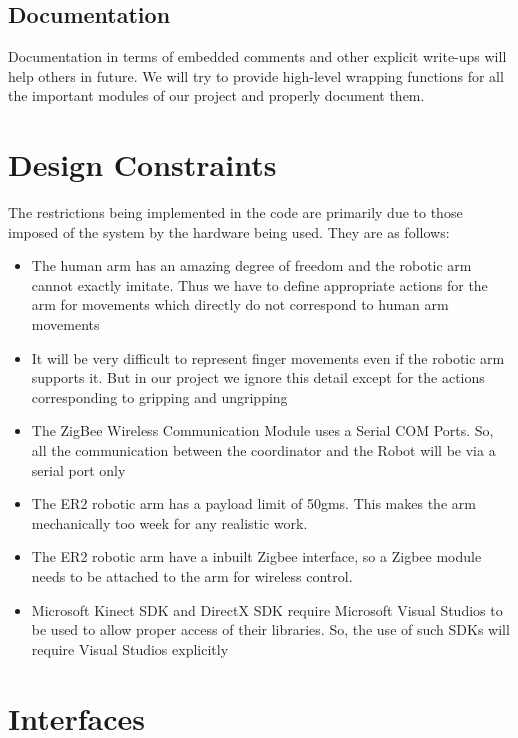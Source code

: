 \documentclass[a4wide]{scrreprt}
\begin{document}
\subsection{Documentation}
 Documentation in terms of embedded comments and other explicit write-ups will
help others in future. We will try to provide high-level wrapping functions for all the important modules of our project and properly document them.

\section{Design Constraints}
The restrictions being implemented in the code are primarily due to those imposed of the system by the hardware being used. They are as follows:
\begin{itemize}
\item The human arm has an amazing degree of freedom and the robotic arm cannot exactly imitate. Thus we have to define appropriate actions for the arm for movements which directly do not correspond to human arm movements
\item It will be very difficult to represent finger movements even if the robotic arm supports it. But in our project we ignore this detail except for the actions corresponding to gripping and ungripping
\item The ZigBee Wireless Communication Module uses a Serial COM Ports. So, all the communication between the coordinator and the Robot will be via a serial port only
\item The ER2 robotic arm has a payload limit of 50gms. This makes the arm mechanically too week for any realistic work.
\item The ER2 robotic arm have a inbuilt Zigbee interface, so a Zigbee module needs to be attached to the arm for wireless control.
\item Microsoft Kinect SDK and DirectX SDK require Microsoft Visual Studios to be used to allow proper access of their libraries. So, the use of such SDKs will require Visual Studios explicitly

\end{itemize}


\section{Interfaces}
\end{document}
